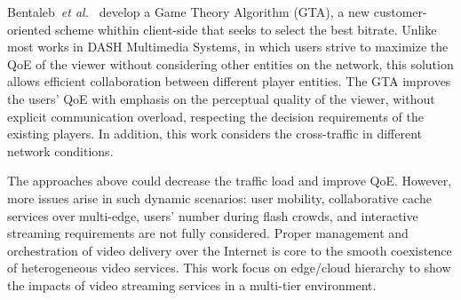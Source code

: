 Bentaleb~\textit{et al.}~\cite{bentaleb:2018:MSys} develop a Game Theory Algorithm (GTA), a new customer-oriented scheme whithin client-side that seeks to select the best bitrate. Unlike most works in DASH Multimedia Systems, in which users strive to maximize the QoE of the viewer without considering other entities on the network, this solution allows efficient collaboration between different player entities. The GTA improves the users' QoE with emphasis on the perceptual quality of the viewer, without explicit communication overload, respecting the decision requirements of the existing players. In addition, this work considers the cross-traffic in different network conditions.

The approaches above could decrease the traffic load and improve QoE. However, more issues arise in such dynamic scenarios: user mobility, collaborative cache services over multi-edge, users' number during flash crowds, and interactive streaming requirements are not fully considered.  Proper management and orchestration of video delivery over the Internet is core to the smooth coexistence of heterogeneous video services. This work focus on edge/cloud hierarchy to show the impacts of video streaming services in a multi-tier environment.

%
%

